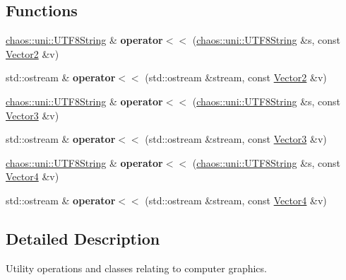 \subsection*{Functions}
\begin{DoxyCompactItemize}
\item 
\hypertarget{namespacechaos_1_1gfx_a1de33c2369485b21d55cb0b17551c175}{\hyperlink{classchaos_1_1uni_1_1_u_t_f8_string}{chaos\-::uni\-::\-U\-T\-F8\-String} \& {\bfseries operator$<$$<$} (\hyperlink{classchaos_1_1uni_1_1_u_t_f8_string}{chaos\-::uni\-::\-U\-T\-F8\-String} \&s, const \hyperlink{classchaos_1_1gfx_1_1_vector2}{Vector2} \&v)}\label{namespacechaos_1_1gfx_a1de33c2369485b21d55cb0b17551c175}

\item 
\hypertarget{namespacechaos_1_1gfx_ab0c024010ee012b4c4083a5457f44fe9}{std\-::ostream \& {\bfseries operator$<$$<$} (std\-::ostream \&stream, const \hyperlink{classchaos_1_1gfx_1_1_vector2}{Vector2} \&v)}\label{namespacechaos_1_1gfx_ab0c024010ee012b4c4083a5457f44fe9}

\item 
\hypertarget{namespacechaos_1_1gfx_a5479948e624623b581c0285c150eb53d}{\hyperlink{classchaos_1_1uni_1_1_u_t_f8_string}{chaos\-::uni\-::\-U\-T\-F8\-String} \& {\bfseries operator$<$$<$} (\hyperlink{classchaos_1_1uni_1_1_u_t_f8_string}{chaos\-::uni\-::\-U\-T\-F8\-String} \&s, const \hyperlink{classchaos_1_1gfx_1_1_vector3}{Vector3} \&v)}\label{namespacechaos_1_1gfx_a5479948e624623b581c0285c150eb53d}

\item 
\hypertarget{namespacechaos_1_1gfx_a05bd520f9a9d1749435f253c2ef3eeb0}{std\-::ostream \& {\bfseries operator$<$$<$} (std\-::ostream \&stream, const \hyperlink{classchaos_1_1gfx_1_1_vector3}{Vector3} \&v)}\label{namespacechaos_1_1gfx_a05bd520f9a9d1749435f253c2ef3eeb0}

\item 
\hypertarget{namespacechaos_1_1gfx_a64b66c65748de4785cef34e1a2726808}{\hyperlink{classchaos_1_1uni_1_1_u_t_f8_string}{chaos\-::uni\-::\-U\-T\-F8\-String} \& {\bfseries operator$<$$<$} (\hyperlink{classchaos_1_1uni_1_1_u_t_f8_string}{chaos\-::uni\-::\-U\-T\-F8\-String} \&s, const \hyperlink{classchaos_1_1gfx_1_1_vector4}{Vector4} \&v)}\label{namespacechaos_1_1gfx_a64b66c65748de4785cef34e1a2726808}

\item 
\hypertarget{namespacechaos_1_1gfx_a573c92de32be52fd7444d574e5dd361f}{std\-::ostream \& {\bfseries operator$<$$<$} (std\-::ostream \&stream, const \hyperlink{classchaos_1_1gfx_1_1_vector4}{Vector4} \&v)}\label{namespacechaos_1_1gfx_a573c92de32be52fd7444d574e5dd361f}

\end{DoxyCompactItemize}


\subsection{Detailed Description}
Utility operations and classes relating to computer graphics. 